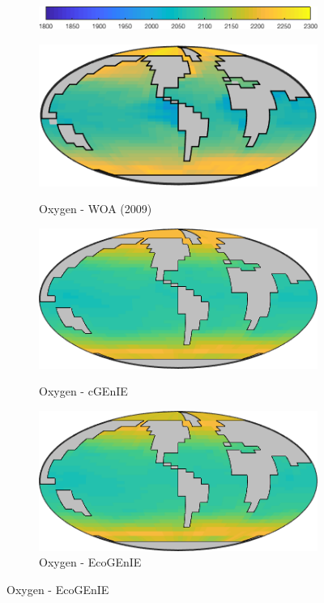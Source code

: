\documentclass{article}
\begin{document}
\begin{figure}[htp]
\begin{subfigure}{.33\textwidth}
 \label{fig:carbon2}
\end{subfigure}
\\[+0.2cm]
\begin{subfigure}{.5\textwidth}
 \includegraphics[width=0.95\linewidth]{../separate_figures/ECOGEM/ocn_DIC_clrbr.png}
\end{subfigure}
\begin{subfigure}{.33\textwidth}
 \caption{Oxygen - WOA (2009)}
 \includegraphics[width=0.95\linewidth]{../separate_figures/OBSERVATIONS/surface_o_an.png}
 \label{fig:nutrients1}
\end{subfigure}%
\begin{subfigure}{.33\textwidth}
 \caption{Oxygen - cGEnIE}
 \includegraphics[width=0.95\linewidth]{../separate_figures/BIOGEM/ocn_O2.png}
 \label{fig:carbon3}
\end{subfigure}%
\begin{subfigure}{.33\textwidth}
 \caption{Oxygen - EcoGEnIE}
 \includegraphics[width=0.95\linewidth]{../separate_figures/ECOGEM/ocn_O2.png}

\end{subfigure}
\end{figure}
\end{document}
